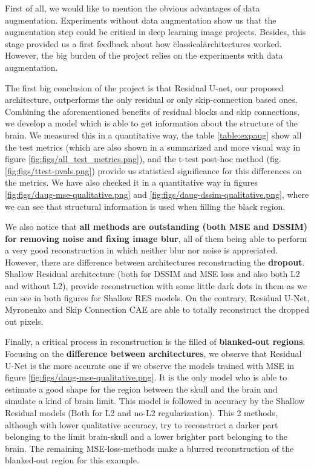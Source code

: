 
First of all, we would like to mention the obvious advantages of data augmentation. Experiments without data augmentation show us that the augmentation step could be critical in deep learning image projects. Besides, this stage provided us a first feedback about how \"classical\" architectures worked. However, the big burden of the project relies on the experiments with data augmentation.

The first big conclusion of the project is that Residual U-net, our proposed architecture, outperforms the only residual or only skip-connection based ones. Combining the aforementioned benefits of residual blocks and skip connections, we develop a model which is able to get information about the structure of the brain. We measured this in a quantitative way, the table \ref{table:expaug} show all the test metrics (which are also shown in a summarized and more visual way in figure \ref{fig:figs/all_test_metrics.png}), and the t-test post-hoc method (fig. \ref{fig:figs/ttest-pvals.png}) provide us statistical significance for this differences on the metrics. We have also checked it in a quantitative way in figures \ref{fig:figs/daug-mse-qualitative.png} and \ref{fig:figs/daug-dssim-qualitative.png}, where we can see that structural information is used when filling the black region.

We also notice that \textbf{all methods are outstanding (both MSE and DSSIM) for removing noise and fixing image blur}, all of them being able to perform a very good reconstruction in which neither blur nor noise is appreciated. However, there are difference between architectures reconstructing the \textbf{dropout}. Shallow Residual architecture (both for DSSIM and MSE loss and also both L2 and without L2), provide reconstruction with some little dark dots in them as we can see in both figures for Shallow RES models. On the contrary, Residual U-Net, Myronenko and Skip Connection CAE are able to totally reconstruct the dropped out pixels. 

Finally, a critical process in reconstruction is the filled of \textbf{blanked-out regions}. Focusing on the \textbf{difference between architectures}, we observe that Residual U-Net is the more accurate one if we observe the models trained with MSE in figure \ref{fig:figs/daug-mse-qualitative.png}. It is the only model who is able to estimate a good shape for the region between the skull and the brain and simulate a kind of brain limit. This model is followed in accuracy by the Shallow Residual models (Both for L2 and no-L2 regularization). This 2 methods, although with lower qualitative accuracy, try to reconstruct a darker part belonging to the limit brain-skull and a lower brighter part belonging to the brain. The remaining MSE-loss-methods make a blurred reconstruction of the blanked-out region for this example. 

